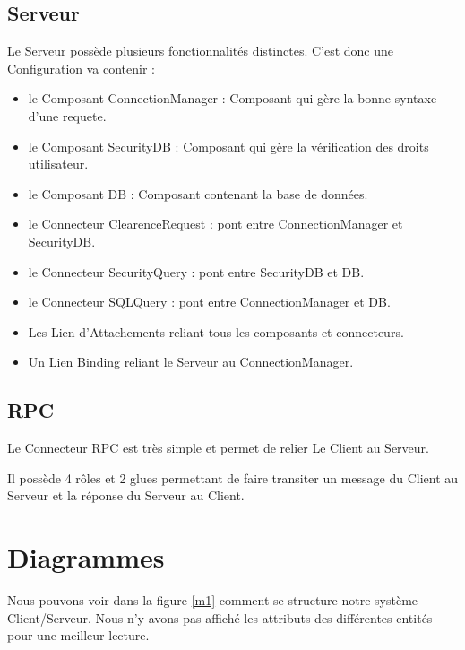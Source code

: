 	\subsection{Serveur}
		Le Serveur possède plusieurs fonctionnalités distinctes. C'est donc une
		Configuration va contenir :
		\begin{itemize}
			\item le Composant ConnectionManager : Composant qui gère la bonne syntaxe d'une requete.
			\item le Composant SecurityDB : Composant qui gère la vérification des droits utilisateur.
			\item le Composant DB : Composant contenant la base de données.
			\item le Connecteur ClearenceRequest : pont entre ConnectionManager et SecurityDB.
			\item le Connecteur SecurityQuery : pont entre SecurityDB et DB.
			\item le Connecteur SQLQuery : pont entre ConnectionManager et DB.
			\item Les Lien d'Attachements reliant tous les composants et connecteurs.
			\item Un Lien Binding reliant le Serveur au ConnectionManager.
			\end{itemize}
	
	\subsection{RPC}
		Le Connecteur RPC est très simple et permet de relier Le Client au Serveur.
		
		Il possède 4 rôles et 2 glues permettant de faire transiter un message du
		Client au Serveur et la réponse du Serveur au Client.

\section{Diagrammes}

Nous pouvons voir dans la figure \ref{m1} comment se structure notre système
Client/Serveur. Nous n'y avons pas affiché les attributs des différentes entités pour une meilleur lecture.

